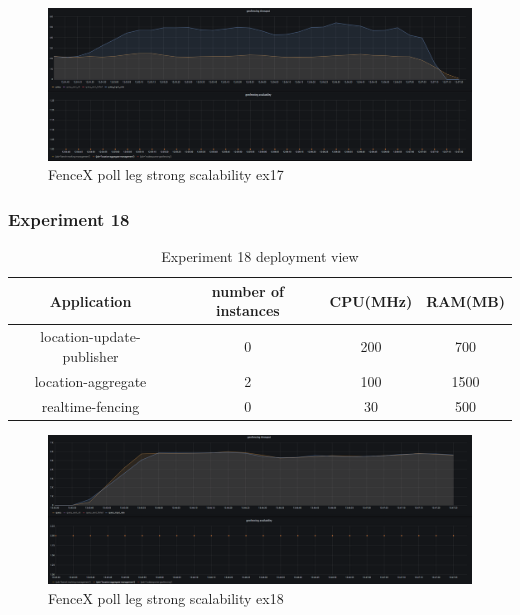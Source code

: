 \documentclass[a4]{report}
\begin{document}
    \begin{figure}[h!]
        \caption{FenceX poll leg strong scalability ex17}
        \label{fig:ex17}
        \includegraphics[scale=0.4]{images/evaluation/ex17-benchmarking-ongoing-2per4sec.png}
    \end{figure}

    \clearpage

    \subsubsection{Experiment 18}
    \begin{table}[h!]
        \centering
        \begin{tabular}{|c|c|c|c|}
            \hline
            Application               & number of instances & CPU(MHz) & RAM(MB) \\
            \hline
            location-update-publisher & 0                   & 200      & 700     \\
            location-aggregate        & 2                   & 100      & 1500    \\
            realtime-fencing          & 0                   & 30       & 500     \\
            \hline
        \end{tabular}
        \caption{Experiment 18 deployment view}
        \label{table:ex18-dv}
    \end{table}

    \begin{figure}[h!]
        \caption{FenceX poll leg strong scalability ex18}
        \label{fig:ex18}
        \includegraphics[scale=0.4]{images/evaluation/ex18-benchmarking-ongoing-2per4sec.png}
    \end{figure}
\end{document}
